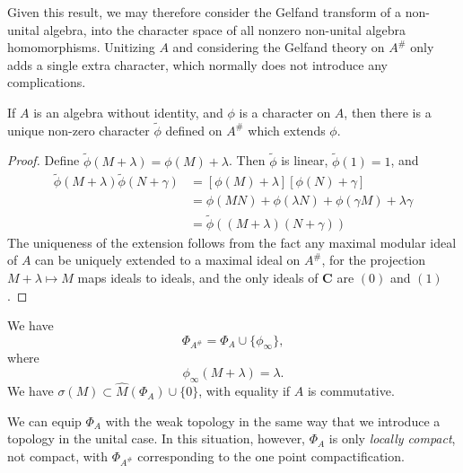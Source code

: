 Given this result, we may therefore consider the Gelfand transform of a non-unital algebra, into the character space of all nonzero non-unital algebra homomorphisms. Unitizing $A$ and considering the Gelfand theory on $A^\#$ only adds a single extra character, which normally does not introduce any complications.

\begin{lemma}
    If $A$ is an algebra without identity, and $\phi$ is a character on $A$, then there is a unique non-zero character $\tilde{\phi}$ defined on $A^\#$ which extends $\phi$.
\end{lemma}
\begin{proof}
    Define $\tilde{\phi}(M + \lambda) = \phi(M) + \lambda$. Then $\tilde{\phi}$ is linear, $\tilde{\phi}(1) = 1$, and
    \begin{align*}
        \tilde{\phi}(M + \lambda) \tilde{\phi}(N + \gamma) &= [\phi(M) + \lambda][\phi(N) + \gamma]\\
        &= \phi(MN) + \phi(\lambda N) + \phi(\gamma M) + \lambda \gamma\\
        &= \tilde{\phi}((M + \lambda)(N + \gamma))
    \end{align*}
    The uniqueness of the extension follows from the fact any maximal modular ideal of $A$ can be uniquely extended to a maximal ideal on $A^\#$, for the projection $M + \lambda \mapsto M$ maps ideals to ideals, and the only ideals of $\mathbf{C}$ are $(0)$ and $(1)$.
\end{proof}

\begin{corollary}
    We have
    \[ \Phi_{A^\#} = \Phi_A \cup \{ \phi_\infty \}, \]
    where
    \[ \phi_\infty(M + \lambda) = \lambda. \]
    We have $\sigma(M) \subset \widehat{M}(\Phi_A) \cup \{ 0 \}$, with equality if $A$ is commutative.
\end{corollary}

We can equip $\Phi_A$ with the weak topology in the same way that we introduce a topology in the unital case. In this situation, however, $\Phi_A$ is only \emph{locally compact}, not compact, with $\Phi_{A^\#}$ corresponding to the one point compactification.

